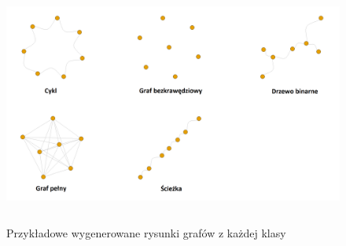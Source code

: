 \begin{figure}[ht]
	\centering
	\includegraphics[height=8cm]{resources/tests/images/gen-graphs-generated.png}
	\caption{Przykładowe wygenerowane rysunki grafów z każdej klasy}
	\label{Fig:tests-generation-1}
\end{figure}
\FloatBarrier